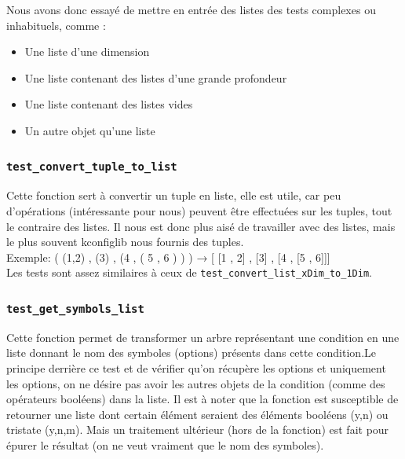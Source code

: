 \documentclass[16pts]{report}
\begin{document}
Nous avons donc essayé de mettre en entrée des listes des tests complexes ou 
inhabituels, comme : \\

\begin{itemize}
    \item Une liste d’une dimension
    \item Une liste contenant des listes d'une grande profondeur
    \item Une liste contenant des listes vides
    \item Un autre objet qu'une liste
\end{itemize}

\subsubsection{\texttt{test\_convert\_tuple\_to\_list}}

Cette fonction sert à convertir un tuple en liste, elle est utile, car peu
d'opérations (intéressante pour nous) peuvent être effectuées sur les tuples, tout le contraire des 
listes. Il nous est donc plus aisé de travailler avec des listes, mais le 
plus souvent kconfiglib nous fournis des tuples. \\

Exemple: ( (1,2) , (3) , (4 , ( 5 , 6 ) ) ) → [ [1 , 2] , [3] , [4 , [5 , 6]]] 
\\

Les tests sont assez similaires à ceux de \verb|test_convert_list_xDim_to_1Dim|. \\


\subsubsection{\texttt{test\_get\_symbols\_list}}

Cette fonction permet de transformer un arbre représentant une condition
en une liste donnant le nom des symboles (options) présents dans cette 
condition.Le principe derrière ce test et de vérifier qu'on récupère les 
options et uniquement les options, on ne désire pas avoir les autres objets 
de la condition (comme des opérateurs booléens) dans la liste.
Il est à noter que la fonction est susceptible de retourner une liste dont 
certain élément seraient des éléments booléens (y,n) ou tristate (y,n,m). 
Mais un traitement ultérieur (hors de la fonction) est fait pour épurer le résultat (on ne 
veut vraiment que le nom des symboles).
\\
\end{document}
